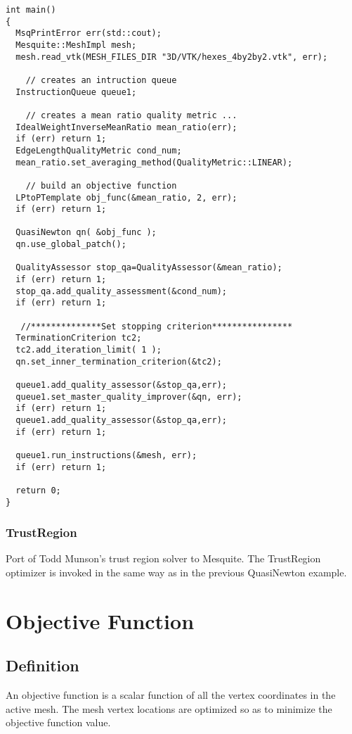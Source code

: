 \begin{lstlisting}[frame=single]
int main()
{
  MsqPrintError err(std::cout);
  Mesquite::MeshImpl mesh;
  mesh.read_vtk(MESH_FILES_DIR "3D/VTK/hexes_4by2by2.vtk", err);
  
    // creates an intruction queue
  InstructionQueue queue1;
  
    // creates a mean ratio quality metric ...
  IdealWeightInverseMeanRatio mean_ratio(err);
  if (err) return 1;
  EdgeLengthQualityMetric cond_num;
  mean_ratio.set_averaging_method(QualityMetric::LINEAR);
  
    // build an objective function
  LPtoPTemplate obj_func(&mean_ratio, 2, err);
  if (err) return 1;

  QuasiNewton qn( &obj_func );
  qn.use_global_patch();
  
  QualityAssessor stop_qa=QualityAssessor(&mean_ratio);
  if (err) return 1;
  stop_qa.add_quality_assessment(&cond_num);
  if (err) return 1;
    
   //**************Set stopping criterion****************
  TerminationCriterion tc2;
  tc2.add_iteration_limit( 1 );
  qn.set_inner_termination_criterion(&tc2);

  queue1.add_quality_assessor(&stop_qa,err);
  queue1.set_master_quality_improver(&qn, err); 
  if (err) return 1;
  queue1.add_quality_assessor(&stop_qa,err);
  if (err) return 1;

  queue1.run_instructions(&mesh, err);
  if (err) return 1;
  
  return 0;
}
\end{lstlisting}


\subsubsection{TrustRegion}
Port of Todd Munson's trust region solver to Mesquite.  The TrustRegion optimizer is invoked in the same way as in the previous QuasiNewton example.


\section{Objective Function}
\label{sec:ObjectiveFunction}

\subsection{Definition}

An objective function is a scalar function of all the vertex coordinates in the active mesh.  The mesh vertex locations are optimized so as to minimize the objective function value.  

